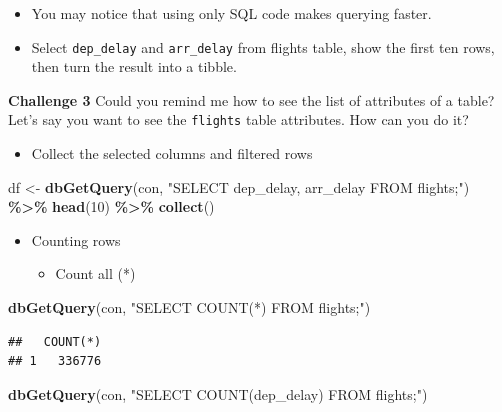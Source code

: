 \documentclass[
]{book}
\newenvironment{Shaded}{\begin{snugshade}}{\end{snugshade}}
\newcommand{\DecValTok}[1]{\textcolor[rgb]{0.00,0.00,0.81}{#1}}
\newcommand{\FunctionTok}[1]{\textcolor[rgb]{0.13,0.29,0.53}{\textbf{#1}}}
\newcommand{\NormalTok}[1]{#1}
\newcommand{\OtherTok}[1]{\textcolor[rgb]{0.56,0.35,0.01}{#1}}
\newcommand{\SpecialCharTok}[1]{\textcolor[rgb]{0.81,0.36,0.00}{\textbf{#1}}}
\newcommand{\StringTok}[1]{\textcolor[rgb]{0.31,0.60,0.02}{#1}}
\providecommand{\tightlist}{%
  \setlength{\itemsep}{0pt}\setlength{\parskip}{0pt}}
\begin{document}
\begin{itemize}
\item
  You may notice that using only SQL code makes querying faster.
\item
  Select \texttt{dep\_delay} and \texttt{arr\_delay} from flights table, show the first ten rows, then turn the result into a tibble.
\end{itemize}

\textbf{Challenge 3}
Could you remind me how to see the list of attributes of a table? Let's say you want to see the \texttt{flights} table attributes. How can you do it?

\begin{itemize}
\tightlist
\item
  Collect the selected columns and filtered rows
\end{itemize}

\begin{Shaded}
\begin{Highlighting}[]
\NormalTok{df }\OtherTok{\textless{}{-}} \FunctionTok{dbGetQuery}\NormalTok{(con, }
  \StringTok{"SELECT dep\_delay, arr\_delay FROM flights;"}\NormalTok{) }\SpecialCharTok{\%\textgreater{}\%}
  \FunctionTok{head}\NormalTok{(}\DecValTok{10}\NormalTok{) }\SpecialCharTok{\%\textgreater{}\%}
  \FunctionTok{collect}\NormalTok{()}
\end{Highlighting}
\end{Shaded}

\begin{itemize}
\item
  Counting rows

  \begin{itemize}
  \tightlist
  \item
    Count all (*)
  \end{itemize}
\end{itemize}

\begin{Shaded}
\begin{Highlighting}[]
\FunctionTok{dbGetQuery}\NormalTok{(con, }
          \StringTok{"SELECT COUNT(*) }
\StringTok{           FROM flights;"}\NormalTok{) }
\end{Highlighting}
\end{Shaded}

\begin{verbatim}
##   COUNT(*)
## 1   336776
\end{verbatim}

\begin{Shaded}
\begin{Highlighting}[]
\FunctionTok{dbGetQuery}\NormalTok{(con, }
           \StringTok{"SELECT COUNT(dep\_delay)}
\StringTok{           FROM flights;"}\NormalTok{)}
\end{Highlighting}
\end{Shaded}
\end{document}
